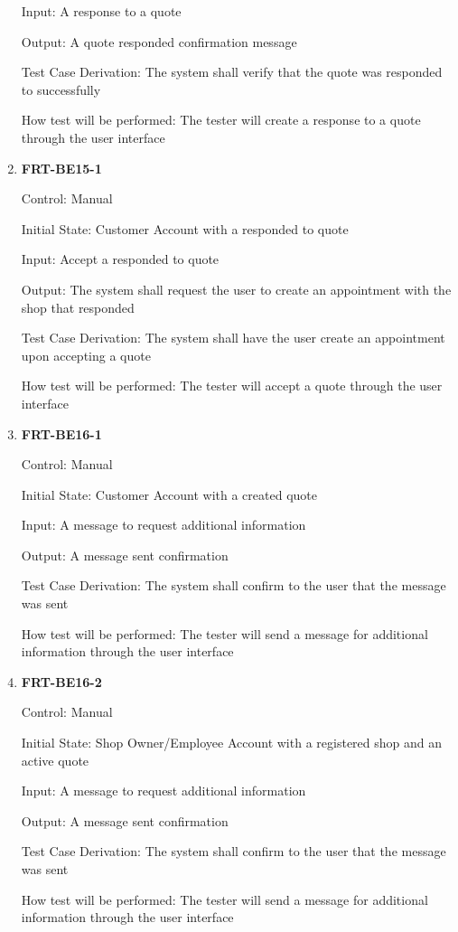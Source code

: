 \documentclass[12pt, titlepage]{article}
\begin{document}
\begin{enumerate}
	      Input: A response to a quote

	      Output: A quote responded confirmation message

	      Test Case Derivation: The system shall verify that the quote was responded to successfully

	      How test will be performed: The tester will create a response to a quote through the user interface

	\item \textbf{FRT-BE15-1}

	      Control: Manual

	      Initial State: Customer Account with a responded to quote

	      Input: Accept a responded to quote

	      Output: The system shall request the user to create an appointment with the shop that responded

	      Test Case Derivation: The system shall have the user create an appointment upon accepting a quote

	      How test will be performed: The tester will accept a quote through the user interface

	\item \textbf{FRT-BE16-1}

	      Control: Manual

	      Initial State: Customer Account with a created quote

	      Input: A message to request additional information

	      Output: A message sent confirmation

	      Test Case Derivation: The system shall confirm to the user that the message was sent

	      How test will be performed: The tester will send a message for additional information through the
	      user interface

	\item \textbf{FRT-BE16-2}

	      Control: Manual

	      Initial State: Shop Owner/Employee Account with a registered shop and an active quote

	      Input: A message to request additional information

	      Output: A message sent confirmation

	      Test Case Derivation: The system shall confirm to the user that the message was sent

	      How test will be performed: The tester will send a message for additional information through the
	      user interface
\end{enumerate}
\end{document}
